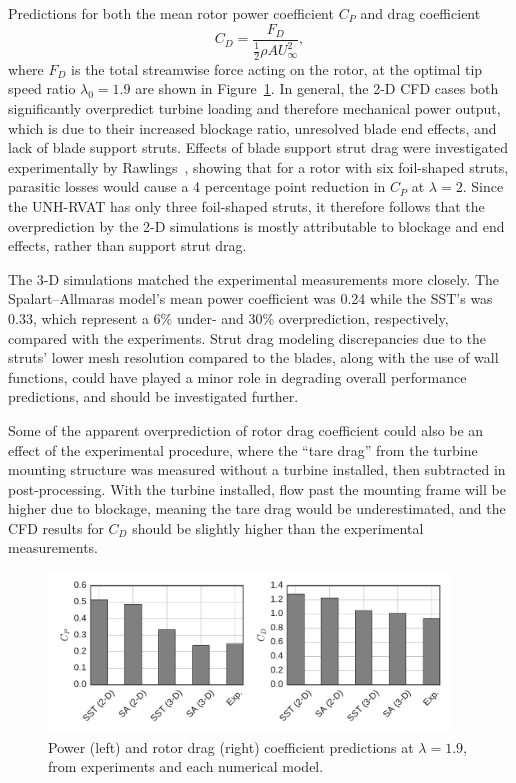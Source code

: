 \documentclass[aip,graphicx]{revtex4-1}
\begin{document}
Predictions for both the mean rotor power coefficient $C_P$ and drag coefficient
\begin{equation}
    C_D = \frac{F_D}{\frac{1}{2} \rho A U_\infty^2},
    \label{eq:cd}
\end{equation}
where $F_D$ is the total streamwise force acting on the rotor, at the optimal
tip speed ratio $\lambda_0 = 1.9$ are shown in
Figure~\ref{fig:br-cfd-perf-bar-chart}. In general, the 2-D CFD cases both
significantly overpredict turbine loading and therefore mechanical power output,
which is due to their increased blockage ratio, unresolved blade end effects,
and lack of blade support struts. Effects of blade support strut drag were
investigated experimentally by Rawlings~\cite{Rawlings2008}, showing that for a
rotor with six foil-shaped struts, parasitic losses would cause a 4 percentage
point reduction in $C_P$ at $\lambda=2$. Since the UNH-RVAT has only three
foil-shaped struts, it therefore follows that the overprediction by the 2-D
simulations is mostly attributable to blockage and end effects, rather than
support strut drag.

The 3-D simulations matched the experimental measurements more closely. The
Spalart--Allmaras model's mean power coefficient was 0.24 while the SST's was
0.33, which represent a 6\% under- and 30\% overprediction, respectively,
compared with the experiments. Strut drag modeling discrepancies due to the
struts' lower mesh resolution compared to the blades, along with the use of wall
functions, could have played a minor role in degrading overall performance
predictions, and should be investigated further.

Some of the apparent overprediction of rotor drag coefficient could also be an
effect of the experimental procedure, where the ``tare drag'' from the turbine
mounting structure was measured without a turbine installed, then subtracted in
post-processing. With the turbine installed, flow past the mounting frame will
be higher due to blockage, meaning the tare drag would be underestimated, and
the CFD results for $C_D$ should be slightly higher than the experimental
measurements.

\begin{figure}
    \centering

    \includegraphics[width=0.95\textwidth]{perf_bar_chart}

    \caption{Power (left) and rotor drag (right) coefficient predictions at
    $\lambda = 1.9$, from experiments and each numerical model.}

    \label{fig:br-cfd-perf-bar-chart}
\end{figure}
\end{document}
